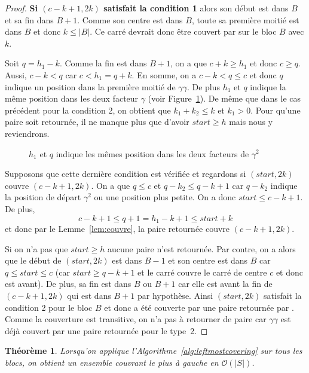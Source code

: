 \documentclass[10pt,letterpaper,oneside]{article}
\newtheorem{theorem}{Théorème}
\newcommand{\bigo}{\mathcal{O}}
\begin{document}
\begin{proof}
    \textbf{Si $(c-k+1,2k)$ satisfait la condition 1} alors son début est  dans $B$ et sa fin dans $B+1$. Comme son centre est dans $B$, toute sa première moitié est dans $B$ et donc $k\leq |B|$. Ce carré devrait donc être couvert par  sur le bloc $B$ avec $k$.
    
    Soit $q=h_1-k$. Comme la fin est dans $B+1$, on a que $c+k\geq h_1$ et donc $c\geq q$. Aussi, $c-k<q$ car $c<h_1=q+k$. En somme, on a $c-k<q\leq c$ et donc $q$ indique un position dans la première moitié de $\gamma\gamma$. De plus $h_1$ et $q$ indique la même position dans les deux facteur $\gamma$ (voir Figure~\ref{fig:gammaa}). De même que dans le cas précédent pour la condition 2, on obtient que $k_1+k_2\leq k$ et $k_1>0$. Pour qu'une paire soit retournée, il ne manque plus que d'avoir $start\geq h$ mais nous y reviendrons.
    \begin{figure}[htb]
        \centering
        
        \caption{$h_1$ et $q$ indique les mêmes position dans les deux facteurs de $\gamma^2$} \label{fig:gammaa}
    \end{figure}
    Supposons que cette dernière condition est vérifiée et regardons si $(start,2k)$ couvre $(c-k+1,2k)$. On a que $q\leq c$ et $q-k_2\leq q-k+1$ car $q-k_2$ indique la position de départ $\gamma^2$ ou une position plus petite. On a donc $start\leq c-k+1$.
    De plus,
    $$c-k+1\leq q +1 = h_1-k+1\leq start+k$$
    et donc par le Lemme~\ref{lem:couvre}, la paire retournée couvre $(c-k+1,2k)$.
    
    Si on n'a pas que $start\geq h$ aucune paire n'est retournée. Par contre, on a alors que le début de $(start,2k)$ est dans $B-1$ et son centre est dans $B$ car $q\leq start \leq c$ (car $start\geq q-k+1$ et le carré couvre le carré de centre $c$ et donc est avant). De plus, sa fin est dans $B$ ou $B+1$ car elle est avant la fin de $(c-k+1,2k)$ qui est dans $B+1$ par hypothèse. Ainsi $(start,2k)$ satisfait la condition 2 pour le bloc $B$ et donc a été couverte par une paire retournée par . Comme la couverture est transitive, on n'a pas à retourner de paire car $\gamma\gamma$ est déjà couvert par une paire retournée pour le type~2.
\end{proof}

\begin{theorem}
    Lorsqu'on applique l'Algorithme~\ref{alg:leftmostcovering} sur tous les blocs, on obtient un ensemble couvrant le plus à gauche en $\bigo(|S|)$.
\end{theorem}
\end{document}
